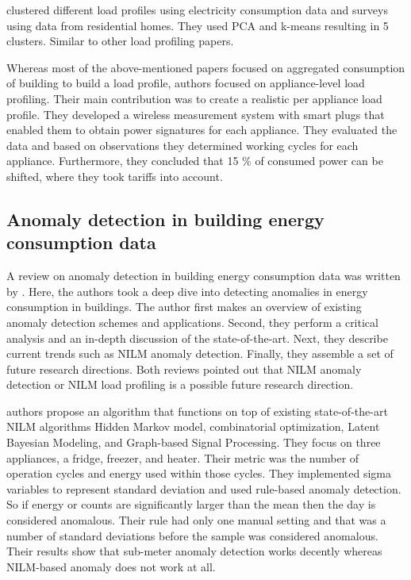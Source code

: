 \cite{Joana2012} clustered different load profiles using electricity consumption data and surveys using data from residential homes.
They used PCA and k-means resulting in 5 clusters. Similar to other load profiling papers. 

Whereas most of the above-mentioned papers focused on aggregated consumption of building to build a load profile,
authors \cite{Issi2018} focused on appliance-level load profiling.
Their main contribution was to create a realistic per appliance load profile.
They developed a wireless measurement system with smart plugs that enabled them to obtain 
power signatures for each appliance. They evaluated the data and based on observations they determined working cycles for each appliance.
Furthermore, they concluded that 15 \% of consumed power can be shifted, where they took tariffs into account. 

\subsection{Anomaly detection in building energy consumption data}

A review on anomaly detection in building energy consumption data was written by \cite{HIMEUR2021116601}.
Here, the authors took a deep dive into detecting anomalies in energy consumption in buildings. 
The author first makes an overview of existing anomaly detection schemes and applications.
Second, they perform a critical analysis and an in-depth discussion of the state-of-the-art.
Next, they describe current trends such as NILM anomaly detection. Finally, they assemble a set of future research directions. 
Both reviews pointed out that NILM anomaly detection or NILM load profiling is a possible future research direction.

\cite{NILMAD2019} authors propose an algorithm
that functions on top of existing state-of-the-art NILM algorithms Hidden Markov model,
combinatorial optimization, Latent Bayesian Modeling, and Graph-based Signal Processing.
They focus on three appliances, a fridge, freezer, and heater. Their metric was the number of operation cycles and energy used within those cycles. 
They implemented sigma variables to represent standard deviation and used rule-based anomaly detection.
So if energy or counts are significantly larger than the mean then the day is considered anomalous.
Their rule had only one manual setting and that was a number of standard deviations before the sample was considered anomalous.
Their results show that sub-meter anomaly detection works decently whereas NILM-based anomaly does not work at all. 

